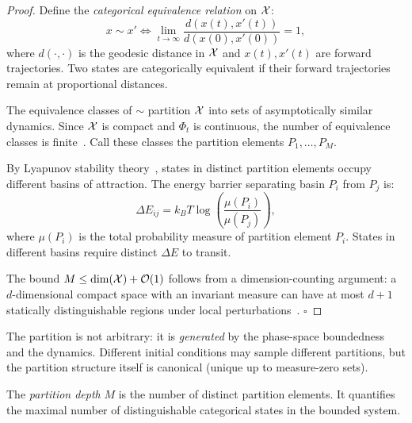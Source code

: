 \begin{proof}
Define the \emph{categorical equivalence relation} on $\mathcal{X}$:
\begin{equation}
  x \sim x' \iff \lim_{t\to\infty} \frac{d(x(t), x'(t))}{d(x(0), x'(0))} = 1,
\end{equation}
where $d(\cdot,\cdot)$ is the geodesic distance in $\mathcal{X}$ and $x(t), x'(t)$ are forward trajectories. Two states are categorically equivalent if their forward trajectories remain at proportional distances.

The equivalence classes of $\sim$ partition $\mathcal{X}$ into sets of asymptotically similar dynamics. Since $\mathcal{X}$ is compact and $\Phi_t$ is continuous, the number of equivalence classes is finite~\cite{Walters1982}. Call these classes the partition elements $P_1, \ldots, P_M$.

By Lyapunov stability theory~\cite{Strogatz1994}, states in distinct partition elements occupy different basins of attraction. The energy barrier separating basin $P_i$ from $P_j$ is:
\begin{equation}
  \Delta E_{ij} = k_B T \log\left(\frac{\mu(P_i)}{\mu(P_j)}\right),
\end{equation}
where $\mu(P_i)$ is the total probability measure of partition element $P_i$. States in different basins require distinct $\Delta E$ to transit.

The bound $M \leq \dim(\mathcal{X}) + \mathcal{O}(1)$ follows from a dimension-counting argument: a $d$-dimensional compact space with an invariant measure can have at most $d+1$ statically distinguishable regions under local perturbations~\cite{Halmos1950}. $\square$
\end{proof}

\begin{remark}
The partition is not arbitrary: it is \emph{generated} by the phase-space boundedness and the dynamics. Different initial conditions may sample different partitions, but the partition structure itself is canonical (unique up to measure-zero sets).
\end{remark}

\begin{definition}
\label{def:partition-depth}
The \emph{partition depth} $M$ is the number of distinct partition elements. It quantifies the maximal number of distinguishable categorical states in the bounded system.
\end{definition}

